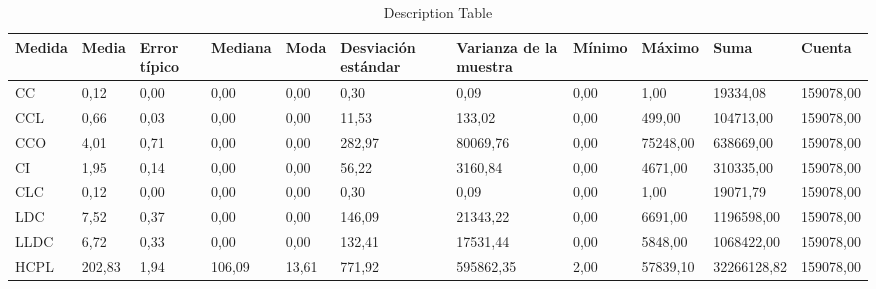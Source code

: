 \begin{table}[H]
{
\captionsetup{labelsep=period, labelfont=bf}
\caption{ Description Table}
\fontsize{9pt}{6pt}\selectfont
\begin{tabular}{@{}lp{10mm}p{10mm}p{10mm}p{10mm}llllll@{}} 
\toprule
Medida& Media & Error   típico & Mediana & Moda & Desviación   estándar & Varianza   de la muestra & Mínimo & Máximo & Suma& Cuenta \\ 
\midrule
CC                                  & 0,12           & 0,00                    & 0,00             & 0,00          & 0,30                           & 0,09                              & 0,00            & 1,00            & 19334,08       & 159078,00       \\
CCL                                 & 0,66           & 0,03                    & 0,00             & 0,00          & 11,53                          & 133,02                            & 0,00            & 499,00          & 104713,00      & 159078,00       \\
CCO                                 & 4,01           & 0,71                    & 0,00             & 0,00          & 282,97                         & 80069,76                          & 0,00            & 75248,00        & 638669,00      & 159078,00       \\
CI                                  & 1,95           & 0,14                    & 0,00             & 0,00          & 56,22                          & 3160,84                           & 0,00            & 4671,00         & 310335,00      & 159078,00       \\
CLC                                 & 0,12           & 0,00                    & 0,00             & 0,00          & 0,30                           & 0,09                              & 0,00            & 1,00            & 19071,79       & 159078,00       \\
LDC                                 & 7,52           & 0,37                    & 0,00             & 0,00          & 146,09                         & 21343,22                          & 0,00            & 6691,00         & 1196598,00     & 159078,00       \\
LLDC                                & 6,72           & 0,33                    & 0,00             & 0,00          & 132,41                         & 17531,44                          & 0,00            & 5848,00         & 1068422,00     & 159078,00       \\
HCPL                                & 202,83         & 1,94                    & 106,09           & 13,61         & 771,92                         & 595862,35                         & 2,00            & 57839,10        & 32266128,82    & 159078,00       \\

\end{tabular}}
\end{table}
